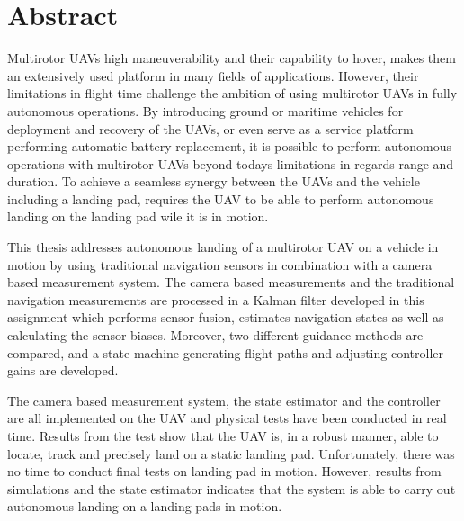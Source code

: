 \chapter{Abstract}\label{cha:abstract}

Multirotor \glspl{UAV} high maneuverability and their capability to hover, makes them an extensively used platform in many fields of applications. However, their limitations in flight time challenge the ambition of using multirotor \glspl{UAV} in fully autonomous operations. By introducing ground or maritime vehicles for deployment and recovery of the \glspl{UAV}, or even serve as a service platform performing automatic battery replacement, it is possible to perform autonomous operations with multirotor \glspl{UAV} beyond todays limitations in regards range and duration. To achieve a seamless synergy between the \glspl{UAV} and the vehicle including a landing pad, requires the UAV to be able to perform autonomous landing on the landing pad wile it is in motion.

This thesis addresses autonomous landing of a multirotor \gls{UAV} on a vehicle in motion by using traditional navigation sensors in combination with a camera based measurement system. The camera based measurements and the traditional navigation measurements are processed in a Kalman filter developed in this assignment which performs sensor fusion, estimates navigation states as well as calculating the sensor biases. Moreover, two different guidance methods are compared, and a state machine generating flight paths and adjusting controller gains are developed. 

The camera based measurement system, the state estimator and the controller are all implemented on the UAV and physical tests have been conducted in real time. Results from the test show that the UAV is, in a robust manner, able to locate, track and precisely land on a static landing pad. Unfortunately, there was no time to conduct final tests on landing pad in motion. However, results from simulations and the state estimator indicates that the system is able to carry out autonomous landing on a landing pads in motion.
